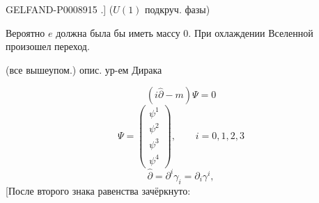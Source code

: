 \begin{GelfandAdjacentEvidence}{GELFAND-P000891}{5}
.] ($U(1)$ подкруч. фазы)

Вероятно $e$ должна была бы иметь массу $0$. При охлаждении Вселенной произошел переход.

 (все вышеупом.) опис. ур-ем Дирака

\begin{equation*}
(i\hat\partial-m)\Psi=0 \tag{1}
\end{equation*}
\[
\Psi=\begin{pmatrix}\psi^1\\\psi^2\\\psi^3\\\psi^4\end{pmatrix},
\qquad i=0,1,2,3
\]
\begin{equation*}
\hat\partial=\partial^i\gamma_i=\partial_i\gamma^i, \tag{2}
\end{equation*}
[После второго знака равенства зачёркнуто: 
\end{GelfandAdjacentEvidence}
